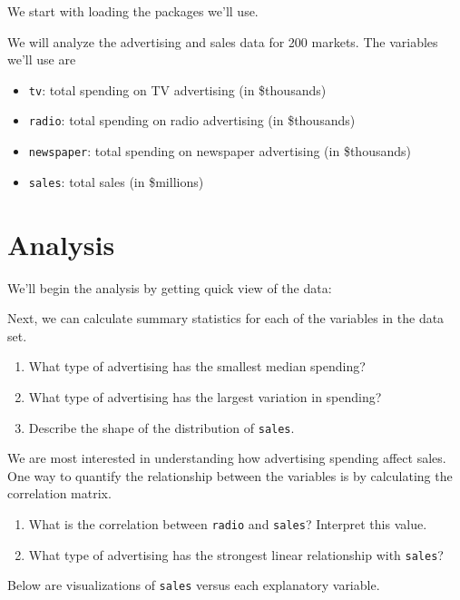 \documentclass[]{book}
\providecommand{\tightlist}{%
  \setlength{\itemsep}{0pt}\setlength{\parskip}{0pt}}
\begin{document}
We start with loading the packages we'll use.

We will analyze the advertising and sales data for 200 markets. The
variables we'll use are

\begin{itemize}
\tightlist
\item
  \texttt{tv}: total spending on TV advertising (in \$thousands)
\item
  \texttt{radio}: total spending on radio advertising (in \$thousands)
\item
  \texttt{newspaper}: total spending on newspaper advertising (in
  \$thousands)
\item
  \texttt{sales}: total sales (in \$millions)
\end{itemize}

\section{Analysis}\label{analysis}

We'll begin the analysis by getting quick view of the data:

Next, we can calculate summary statistics for each of the variables in
the data set.

\begin{enumerate}
\def\labelenumi{\arabic{enumi}.}
\tightlist
\item
  What type of advertising has the smallest median spending?
\item
  What type of advertising has the largest variation in spending?
\item
  Describe the shape of the distribution of \texttt{sales}.
\end{enumerate}

We are most interested in understanding how advertising spending affect
sales. One way to quantify the relationship between the variables is by
calculating the correlation matrix.

\begin{enumerate}
\def\labelenumi{\arabic{enumi}.}
\tightlist
\item
  What is the correlation between \texttt{radio} and \texttt{sales}?
  Interpret this value.
\item
  What type of advertising has the strongest linear relationship with
  \texttt{sales}?
\end{enumerate}

Below are visualizations of \texttt{sales} versus each explanatory
variable.
\end{document}
